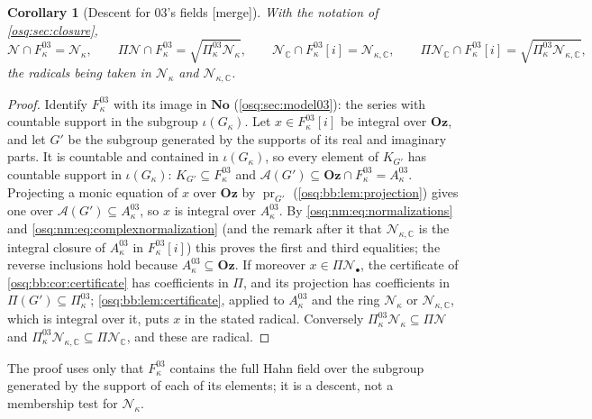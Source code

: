 \documentclass[11pt,letterpaper]{article}
\numberwithin{equation}{section}
\newtheorem{corollary}[corollary]{Corollary}
\theoremstyle{definition}
\theoremstyle{remark}
\theoremstyle{plain}
\newcommand{\No}{\mathbf{No}}
\newcommand{\Oz}{\mathbf{Oz}}
\newcommand{\C}{\mathbb C}
\newcommand{\A}{\mathcal A}          %
\newcommand{\NN}{\mathcal N}         %
\newcommand{\merge}{\textup{\textsf{[merge]}}}
\begin{document}
\begin{corollary}[Descent for 03's fields \merge]\label{osq:bb:cor:descent03}
With the notation of \cref{osq:sec:closure},
\[
 \NN\cap F^{03}_\kappa=\NN_\kappa,\qquad \Pi\NN\cap F^{03}_\kappa=\sqrt{\Pi^{03}_\kappa\NN_\kappa},\qquad
 \NN_\C\cap F^{03}_\kappa[i]=\NN_{\kappa,\C},\qquad \Pi\NN_\C\cap F^{03}_\kappa[i]=\sqrt{\Pi^{03}_\kappa\NN_{\kappa,\C}},
\]
the radicals being taken in $\NN_\kappa$ and $\NN_{\kappa,\C}$.
\end{corollary}
\begin{proof}
Identify $F^{03}_\kappa$ with its image in $\No$ (\cref{osq:sec:model03}): the series with countable support in the subgroup
$\iota(G_\kappa)$. Let $x\in F^{03}_\kappa[i]$ be integral over $\Oz$, and let $G'$ be the subgroup generated by the supports of its
real and imaginary parts. It is countable and contained in $\iota(G_\kappa)$, so every element of $K_{G'}$ has countable support in
$\iota(G_\kappa)$: $K_{G'}\subseteq F^{03}_\kappa$ and $\A(G')\subseteq\Oz\cap F^{03}_\kappa=A^{03}_\kappa$. Projecting a monic
equation of $x$ over $\Oz$ by $\operatorname{pr}_{G'}$ (\cref{osq:bb:lem:projection}) gives one over $\A(G')\subseteq A^{03}_\kappa$,
so $x$ is integral over $A^{03}_\kappa$. By \eqref{osq:nm:eq:normalizations} and \eqref{osq:nm:eq:complexnormalization} (and the
remark after it that $\NN_{\kappa,\C}$ is the integral closure of $A^{03}_\kappa$ in $F^{03}_\kappa[i]$) this proves the first and
third equalities; the reverse inclusions hold because $A^{03}_\kappa\subseteq\Oz$. If moreover $x\in\Pi\NN_\bullet$, the
certificate of \cref{osq:bb:cor:certificate} has coefficients in $\Pi$, and its projection has coefficients in
$\Pi(G')\subseteq\Pi^{03}_\kappa$; \cref{osq:bb:lem:certificate}, applied to $A^{03}_\kappa$ and the ring $\NN_\kappa$ or
$\NN_{\kappa,\C}$, which is integral over it, puts $x$ in the stated radical. Conversely
$\Pi^{03}_\kappa\NN_\kappa\subseteq\Pi\NN$ and $\Pi^{03}_\kappa\NN_{\kappa,\C}\subseteq\Pi\NN_\C$, and these are radical.
\end{proof}

The proof uses only that $F^{03}_\kappa$ contains the full Hahn field over the subgroup generated by the support of each of its
elements; it is a descent, not a membership test for $\NN_\kappa$.
\end{document}
